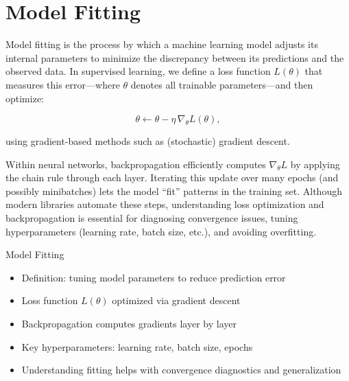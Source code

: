 \section{Model Fitting}





Model fitting is the process by which a machine learning model adjusts its internal 
parameters to minimize the discrepancy between its predictions and the observed data. In supervised learning, we define a loss function
 \(L(\theta)\) that measures this error—where \(\theta\) denotes all trainable parameters—and then optimize:

\[
\theta \leftarrow \theta - \eta\,\nabla_{\theta}L(\theta),
\]

using gradient‐based methods such as (stochastic) gradient descent. 

Within neural networks, backpropagation efficiently computes \(\nabla_{\theta}L\) by applying the chain rule through each layer. 
Iterating this update over many epochs (and possibly minibatches) lets the model “fit” patterns in the training set. 
Although modern libraries automate these steps, understanding loss optimization and backpropagation is essential for diagnosing convergence issues, tuning hyperparameters (learning rate, batch size, etc.), and avoiding overfitting.

\begin{frame}{Model Fitting}
  \begin{itemize}
    \item Definition: tuning model parameters to reduce prediction error
    \item Loss function \(L(\theta)\) optimized via gradient descent
    \item Backpropagation computes gradients layer by layer
    \item Key hyperparameters: learning rate, batch size, epochs
    \item Understanding fitting helps with convergence diagnostics and generalization
  \end{itemize}
\end{frame}
